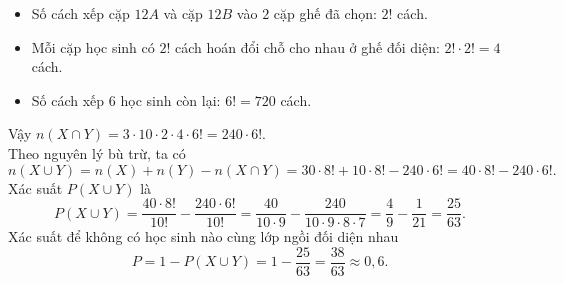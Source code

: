 \begin{ex}
{\begin{itemize}
			\item Số cách xếp cặp $12A$ và cặp $12B$ vào $2$ cặp ghế đã chọn: $2!$ cách.
			\item Mỗi cặp học sinh có $2!$ cách hoán đổi chỗ cho nhau ở ghế đối diện: $2! \cdot 2! = 4$ cách.
			\item Số cách xếp $6$ học sinh còn lại: $6! = 720$ cách.
		\end{itemize}
		Vậy $n(X \cap Y) = 3 \cdot 10 \cdot 2 \cdot 4 \cdot 6! = 240 \cdot 6!.$
		\\Theo nguyên lý bù trừ, ta có 
		\[ n(X \cup Y) = n(X) + n(Y) - n(X \cap Y) = 30 \cdot 8! + 10 \cdot 8! - 240 \cdot 6! = 40 \cdot 8! - 240 \cdot 6!.\]
		Xác suất $P(X \cup Y)$ là
		\[ P(X \cup Y) = \dfrac{40 \cdot 8!}{10!} - \dfrac{240 \cdot 6!}{10!} = \dfrac{40}{10 \cdot 9} - \dfrac{240}{10 \cdot 9 \cdot 8 \cdot 7} = \dfrac{4}{9} - \dfrac{1}{21} = \dfrac{25}{63}.\]
		Xác suất để không có học sinh nào cùng lớp ngồi đối diện nhau
		\[ P = 1 - P(X \cup Y) = 1 - \dfrac{25}{63} = \dfrac{38}{63} \approx 0{,}6. \]
		
		
	}
\end{ex}


